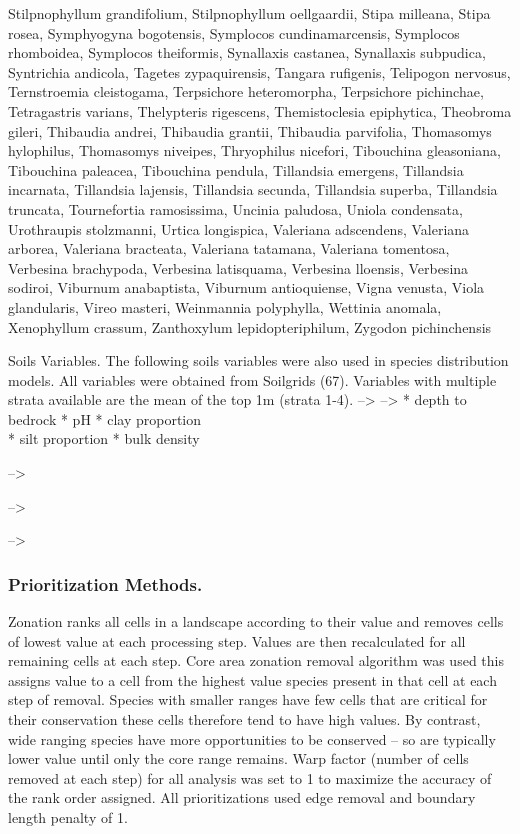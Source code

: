 \documentclass[]{article}
\begin{document}
Stilpnophyllum grandifolium, Stilpnophyllum oellgaardii, Stipa milleana, Stipa rosea, Symphyogyna bogotensis, Symplocos cundinamarcensis, Symplocos rhomboidea, Symplocos theiformis, Synallaxis castanea, Synallaxis subpudica, Syntrichia andicola, Tagetes zypaquirensis, Tangara rufigenis, Telipogon nervosus, Ternstroemia cleistogama, Terpsichore heteromorpha, Terpsichore pichinchae, Tetragastris varians, Thelypteris rigescens, Themistoclesia epiphytica, Theobroma gileri, Thibaudia andrei, Thibaudia grantii, Thibaudia parvifolia, Thomasomys hylophilus, Thomasomys niveipes, Thryophilus nicefori, Tibouchina gleasoniana, Tibouchina paleacea, Tibouchina pendula, Tillandsia emergens, Tillandsia incarnata, Tillandsia lajensis, Tillandsia secunda, Tillandsia superba, Tillandsia truncata, Tournefortia ramosissima, Uncinia paludosa, Uniola condensata, Urothraupis stolzmanni, Urtica longispica, Valeriana adscendens, Valeriana arborea, Valeriana bracteata, Valeriana tatamana, Valeriana tomentosa, Verbesina brachypoda, Verbesina latisquama, Verbesina lloensis, Verbesina sodiroi, Viburnum anabaptista, Viburnum antioquiense, Vigna venusta, Viola glandularis, Vireo masteri, Weinmannia polyphylla, Wettinia anomala, Xenophyllum crassum, Zanthoxylum lepidopteriphilum, Zygodon pichinchensis

Soils Variables. The following soils variables were also used in species distribution models. All variables were obtained from Soilgrids (67). Variables with multiple strata available are the mean of the top 1m (strata 1-4). --\textgreater{} --\textgreater{}
* depth to bedrock
* pH
* clay proportion\\
* silt proportion
* bulk density

--\textgreater{}

--\textgreater{}

--\textgreater{}

\hypertarget{prioritization-methods.}{%
\subsubsection{Prioritization Methods.}\label{prioritization-methods.}}

Zonation ranks all cells in a landscape according to their value and removes cells of lowest value at each processing step. Values are then recalculated for all remaining cells at each step. Core area zonation removal algorithm was used this assigns value to a cell from the highest value species present in that cell at each step of removal. Species with smaller ranges have few cells that are critical for their conservation these cells therefore tend to have high values. By contrast, wide ranging species have more opportunities to be conserved -- so are typically lower value until only the core range remains. Warp factor (number of cells removed at each step) for all analysis was set to 1 to maximize the accuracy of the rank order assigned. All prioritizations used edge removal and boundary length penalty of 1.
\end{document}
